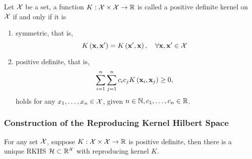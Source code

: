 \begin{definition}
	Let \(\mathcal{X}\) be a set, a function \(K:\mathcal{X}\times\mathcal{X}\rightarrow\mathbb{R}\) is called a positive definite kernel on \(\mathcal{X}\) if and only if it is
	\begin{enumerate}
		\item symmetric, that is,
		      \begin{equation}
			      K\left(\mathbf{x},\mathbf{x}^{\prime}\right)=K\left(\mathbf{x}^{\prime},\mathbf{x}\right),\quad\forall\mathbf{x},\mathbf{x}^{\prime}\in\mathcal{X}
		      \end{equation}
		\item positive definite, that is,
		      \begin{equation}
			      \sum_{i=1}^{n}\sum_{j=1}^{n}c_{i}c_{j}K\left(\mathbf{x}_{i},\mathbf{x}_{j}\right)\geq 0,
		      \end{equation}
		      holds for any \(x_{1},\ldots,x_{n}\in\mathcal{X}\), given \(n\in\mathbb{N},c_{1},\ldots,c_{n}\in\mathbb{R}\).
	\end{enumerate}
\end{definition}

\subsubsection{Construction of the Reproducing Kernel Hilbert Space}

\begin{theorem}\label{thm:morse-aronszajn}
	For any set \(\mathcal{X}\), suppose \(K:\mathcal{X}\times\mathcal{X}\rightarrow\mathbb{R}\) is positive definite, then there is a unique RKHS \(\mathcal{H}\subset\mathbb{R}^{\mathcal{X}}\) with reproducing kernel \(K\).
\end{theorem}

